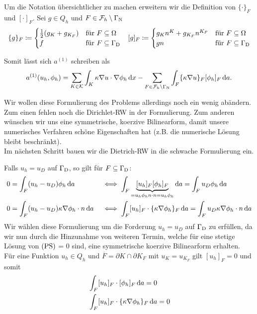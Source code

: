 \begin{notation}
	Um die Notation übersichtlicher zu machen erweitern wir die Definition von $ \{\cdot\}_F $ und $ [\cdot]_F $. Sei $ g \in Q_h $ und $ F \in \mathcal{F}_h \setminus \Gamma_{\text{N}} $
	\begin{align*}
		&\{ g \}_F \coloneqq
		 \begin{cases}
					\frac{1}{2} (g_K + g_{K_F} ) &\text{für } F \subseteq \Omega\\
					f &\text{für } F \subseteq \Gamma_{\text{D}}
		\end{cases}
	  &[g]_F \coloneqq \begin{cases}
			g_K n^K + g_{K_F} n^{K_F} &\text{für } F \subseteq \Omega\\
			g  n &\text{für } F \subseteq \Gamma_{\text{D}}
		\end{cases}
	\end{align*}
	
	Somit lässt sich $ a^{(1)} $ schreiben als
	\[a^{(1)}(u_h, \phi_h) = \sum_{K \in \mathcal{K}} \int_K \kappa \nabla u \cdot \nabla \phi_h \mathop{}\!\mathrm{d} x - \sum_{F \in \mathcal{F}_h \setminus \Gamma_{\text{N}}} \int_{F} \{\kappa \nabla u \}_F [\phi_h]_F \mathop{}\!\mathrm{d} a. \]
\end{notation}





Wir wollen diese Formulierung des Problems allerdings noch ein wenig abändern. Zum einen fehlen noch die Dirichlet-RW in der Formulierung. Zum anderen wünschen wir uns eine symmetrische, koerzive Bilinearform, damit unsere numerisches Verfahren schöne Eigenschaften hat (z.B. die numerische Lösung bleibt beschränkt).\\
Im nächsten Schritt bauen wir die Dietrich-RW in die schwache Formulierung ein.

Falls $ u_h = u_D $ auf $ \Gamma_{\text{D}} $, so gilt für $ F \subseteq \Gamma_{\text{D}}  $:
\begin{align}
	\label{D-RW1}& 0=\int_F (u_h - u_D) \phi_h \mathop{}\!\mathrm{d} a &&\iff \int_F \underbrace{[u_h]_F [\phi_h]_F}_{= u_h \phi_h n \cdot n = u_h \phi_h} \mathop{}\!\mathrm{d} a = \int_F u_D \phi_h \mathop{}\!\mathrm{d} a  \\
	\label{D-RW2}& 0  = \int_F (u_h - u_D) \kappa \nabla \phi_h \cdot n \mathop{}\!\mathrm{d} a  &&\iff \int_F [u_h]_F \cdot \{\kappa \nabla\phi_h\}_F \mathop{}\!\mathrm{d} a = \int_F u_D \kappa \nabla \phi_h \cdot n \mathop{}\!\mathrm{d} a 
\end{align} 
Wir wählen diese Formulierung um die Forderung $ u_h = u_D $ auf $ \Gamma_{\text{D}} $ zu erfüllen, da wir nun durch die Hinzunahme von weiteren Termin, welche für eine stetige Lösung von $ \operatorname{(PS)} $ = 0 sind, eine symmetrische koerzive Bilinearform erhalten.\\
Für eine Funktion $ u_h \in Q_h $ und $ \overline{F} = \partial K \cap \partial K_F $ mit $ u_K = u_{K_F} $ gilt $ [u_h]_F = 0 $ und somit
\begin{align}
	\label{innen1} &\int_F [u_h]_F \cdot [\phi_h]_F \mathop{}\!\mathrm{d} a = 0\\
	\label{innen2}&\int_F [u_h]_F \cdot \{ \kappa\nabla\phi_h \}_F \mathop{}\!\mathrm{d} a = 0
\end{align}


